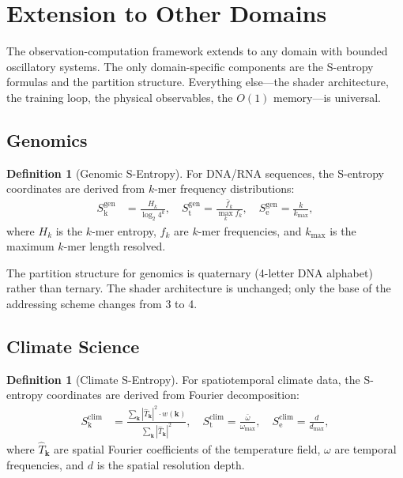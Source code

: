 \documentclass[11pt,twocolumn,a4paper]{article}
\theoremstyle{definition}
\newtheorem{definition}[theorem]{Definition}
\theoremstyle{remark}
\newcommand{\Sk}{S_{\mathrm{k}}}
\newcommand{\St}{S_{\mathrm{t}}}
\newcommand{\Se}{S_{\mathrm{e}}}
\begin{document}
\section{Extension to Other Domains}
\label{sec:extensions}

The observation-computation framework extends to any domain with bounded oscillatory systems. The only domain-specific components are the S-entropy formulas and the partition structure. Everything else---the shader architecture, the training loop, the physical observables, the $O(1)$ memory---is universal.

\subsection{Genomics}

\begin{definition}[Genomic S-Entropy]
For DNA/RNA sequences, the S-entropy coordinates are derived from $k$-mer frequency distributions:
\begin{align}
\Sk^{\mathrm{gen}} &= \frac{H_k}{\log_2 4^k}, \quad \St^{\mathrm{gen}} = \frac{\bar{f}_k}{\max_k f_k}, \quad \Se^{\mathrm{gen}} = \frac{k}{k_{\max}},
\end{align}
where $H_k$ is the $k$-mer entropy, $f_k$ are $k$-mer frequencies, and $k_{\max}$ is the maximum $k$-mer length resolved.
\end{definition}

The partition structure for genomics is quaternary (4-letter DNA alphabet) rather than ternary. The shader architecture is unchanged; only the base of the addressing scheme changes from 3 to 4.

\subsection{Climate Science}

\begin{definition}[Climate S-Entropy]
For spatiotemporal climate data, the S-entropy coordinates are derived from Fourier decomposition:
\begin{align}
\Sk^{\mathrm{clim}} &= \frac{\sum_{\mathbf{k}} |\hat{T}_{\mathbf{k}}|^2 \cdot w(\mathbf{k})}{\sum_{\mathbf{k}} |\hat{T}_{\mathbf{k}}|^2}, \quad \St^{\mathrm{clim}} = \frac{\bar{\omega}}{\omega_{\max}}, \quad \Se^{\mathrm{clim}} = \frac{d}{d_{\max}},
\end{align}
where $\hat{T}_{\mathbf{k}}$ are spatial Fourier coefficients of the temperature field, $\omega$ are temporal frequencies, and $d$ is the spatial resolution depth.
\end{definition}
\end{document}
